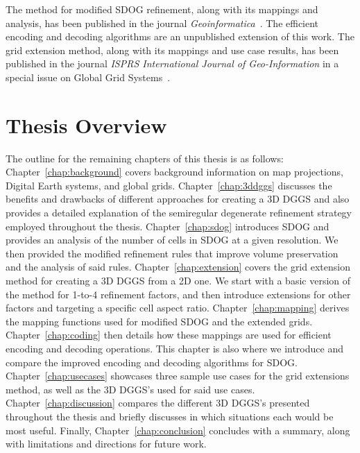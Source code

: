 The method for modified SDOG refinement, along with its mappings and analysis, has been published in the journal \textit{Geoinformatica}~\cite{ulmer2020toward}.
The efficient encoding and decoding algorithms are an unpublished extension of this work.
The grid extension method, along with its mappings and use case results, has been published in the journal \textit{ISPRS International Journal of Geo-Information} in a special issue on Global Grid Systems~\cite{ulmer2020general}.


\section{Thesis Overview} \label{chap:1:overview}
The outline for the remaining chapters of this thesis is as follows:
Chapter~\ref{chap:background} covers background information on map projections, Digital Earth systems, and global grids.
Chapter~\ref{chap:3ddggs} discusses the benefits and drawbacks of different approaches for creating a 3D DGGS and also provides a detailed explanation of the semiregular degenerate refinement strategy employed throughout the thesis.
Chapter~\ref{chap:sdog} introduces SDOG and provides an analysis of the number of cells in SDOG at a given resolution.
We then provided the modified refinement rules that improve volume preservation and the analysis of said rules.
Chapter~\ref{chap:extension} covers the grid extension method for creating a 3D DGGS from a 2D one.
We start with a basic version of the method for 1-to-4 refinement factors, and then introduce extensions for other factors and targeting a specific cell aspect ratio.
Chapter~\ref{chap:mapping} derives the mapping functions used for modified SDOG and the extended grids.
Chapter~\ref{chap:coding} then details how these mappings are used for efficient encoding and decoding operations.
This chapter is also where we introduce and compare the improved encoding and decoding algorithms for SDOG.
Chapter~\ref{chap:usecases} showcases three sample use cases for the grid extensions method, as well as the 3D DGGS's used for said use cases.
Chapter~\ref{chap:discussion} compares the different 3D DGGS's presented throughout the thesis and briefly discusses in which situations each would be most useful.
Finally, Chapter~\ref{chap:conclusion} concludes with a summary, along with limitations and directions for future work.
